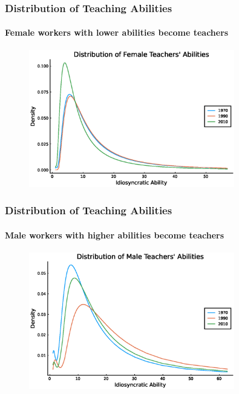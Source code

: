 \documentclass[11pt]{beamer}
\begin{document}
\begin{frame}
\frametitle{Distribution of Teaching Abilities}
\framesubtitle{Female workers with lower abilities become teachers}
\begin{figure}
 \begin{center}
\includegraphics[width=0.8\textwidth]{plots/fT_women_steadystate.eps}
 			\label{ }
 		\end{center}
 	\end{figure}
\end{frame}

\begin{frame}
\frametitle{Distribution of Teaching Abilities}
\framesubtitle{Male workers with higher abilities become teachers}
\begin{figure}
 		\begin{center}
\includegraphics[width=0.8\textwidth]{plots/fT_men_steadystate.eps}
 			\label{ }
 		\end{center}
 	\end{figure}
\end{frame}

\end{document}
